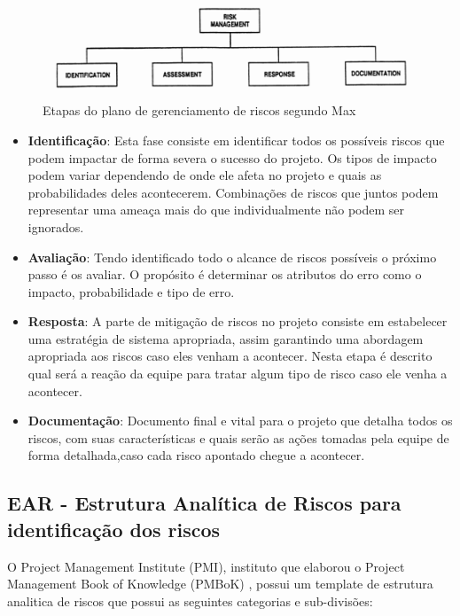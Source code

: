 \begin{apendicesenv}
		\graphicspath{{figuras/}}
		\begin{figure}[h]
		\centering
		\includegraphics[scale=0.80]{EAP_Gerenciamento_de_Riscos.png}
		\caption{Etapas do plano de gerenciamento de riscos segundo Max \cite{wideman1992project}}
		\label{img:eap_gerenciamento_de_risco}
		\end{figure}
	
	\begin{itemize}
	 \item \textbf{Identificação}: Esta fase consiste em identificar todos os possíveis riscos que podem impactar de forma severa o sucesso do projeto. Os tipos de impacto podem variar dependendo de onde ele afeta no projeto e quais as probabilidades deles acontecerem. Combinações de riscos que juntos podem representar uma ameaça mais do que individualmente não podem ser ignorados.
	 \item \textbf{Avaliação}: Tendo identificado todo o alcance de riscos possíveis o próximo passo é os avaliar. O propósito é determinar os atributos do erro como o impacto, probabilidade e tipo de erro.
	\item \textbf{Resposta}: A parte de mitigação de riscos no projeto consiste em estabelecer uma estratégia de sistema apropriada, assim garantindo uma abordagem apropriada aos riscos caso eles venham a acontecer. Nesta etapa é descrito qual será a reação da equipe para tratar algum tipo de risco caso ele venha a acontecer.
	\item \textbf{Documentação}: Documento final e vital para o projeto que detalha todos os riscos, com suas características e quais serão as ações tomadas pela equipe de forma detalhada,caso cada risco apontado chegue a acontecer.
	\end{itemize}

	\subsection{EAR - Estrutura Analítica de Riscos para identificação dos riscos}
	O Project Management Institute (PMI), instituto que elaborou o Project Management Book of Knowledge (PMBoK) \cite{pmbok2012}, possui um template de estrutura analitica de riscos que possui as seguintes categorias e sub-divisões: 
	

\end{apendicesenv}
